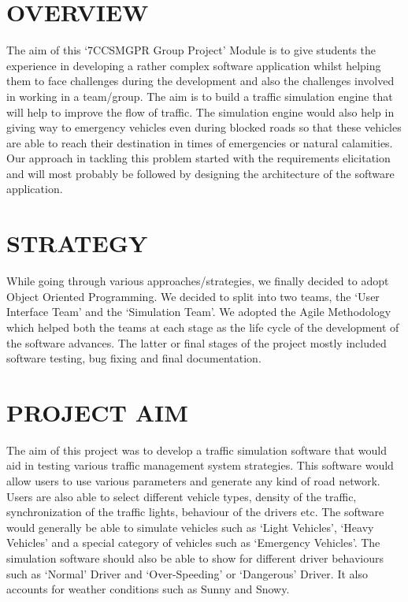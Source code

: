 \documentclass[11pt,a4paper]{article}
\begin{document}
\section{OVERVIEW}

The aim of this ‘7CCSMGPR Group Project’ Module is to give students the experience in developing a rather complex software application whilst helping them to face challenges during the development and also the challenges involved in working in a team/group. The aim is to build a traffic simulation engine that will help to improve the flow of traffic. The simulation engine would also help in giving way to emergency vehicles even during blocked roads so that these vehicles are able to reach their destination in times of emergencies or natural calamities. \newline
Our approach in tackling this problem started with the requirements elicitation and will most probably be followed by designing the architecture of the software application. 


\section{STRATEGY}

While going through various approaches/strategies, we finally decided to adopt Object Oriented Programming. We decided to split into two teams, the ‘User Interface Team’ and the ‘Simulation Team’. We adopted the Agile Methodology which helped both the teams at each stage as the life cycle of the development of the software advances. The latter or final stages of the project mostly included software testing, bug fixing and final documentation.

\section{PROJECT AIM}

The aim of this project was to develop a traffic simulation software that would aid in testing various traffic management system strategies. This software would allow users to use various parameters and generate any kind of road network. Users are also able to select different vehicle types, density of the traffic, synchronization of the traffic lights, behaviour of the drivers etc. The software would generally be able to simulate vehicles such as ‘Light Vehicles’, ‘Heavy Vehicles’ and a special category of vehicles such as ‘Emergency Vehicles’. The simulation software should also be able to show for different driver behaviours such as ‘Normal’ Driver and ‘Over-Speeding’ or ‘Dangerous’ Driver. It also accounts for weather conditions such as Sunny and Snowy.
\end{document}
